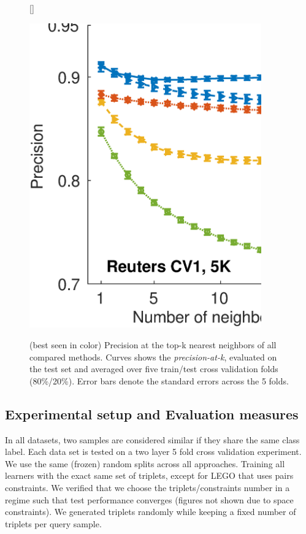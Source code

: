 \documentclass[twoside,11pt]{article}
\begin{document}
\begin{figure}[ht, width=15cm]
\captionsetup{font=small}
[\FBwidth]
{\caption{(best seen in color) Precision at the top-k nearest neighbors of all compared methods. Curves shows the  \textit{precision-at-k}, evaluated on the test set and averaged over five train/test cross validation folds (80\%/20\%). Error bars denote the standard errors across the 5 folds.}\label{precFig}}
{\includegraphics[width=10cm]{Precision_at_K_all_datasets}}
\vskip -0pt
\end{figure}

\subsection{Experimental setup and Evaluation measures}\vskip -5pt
In all datasets, two samples are considered similar if they share the same class label. Each data set is tested on a two layer 5 fold cross validation experiment. We use the same (frozen) random splits across all approaches. Training all learners with the exact same set of triplets, except for LEGO that uses pairs constraints. We verified that we choose the triplets/constraints number in a regime such that test performance converges (figures not shown due to space constraints). We generated triplets randomly while keeping a fixed number of triplets per query sample.
\end{document}
